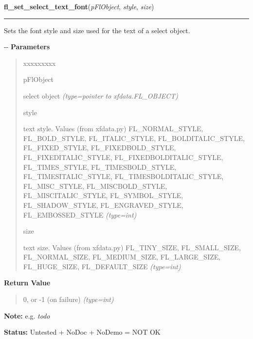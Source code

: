 \hspace{.8\funcindent}\begin{boxedminipage}{\funcwidth}

    \raggedright \textbf{fl\_set\_select\_text\_font}(\textit{pFlObject}, \textit{style}, \textit{size})

    \vspace{-1.5ex}

    \rule{\textwidth}{0.5\fboxrule}
\setlength{\parskip}{2ex}

Sets the font style and size used for the text of a select object.

-{}-
\setlength{\parskip}{1ex}
      \textbf{Parameters}
      \vspace{-1ex}

      \begin{quote}
        \begin{Ventry}{xxxxxxxxx}

          \item[pFlObject]


select object
            {\it (type=pointer to xfdata.FL\_OBJECT)}

          \item[style]


text style. Values (from xfdata.py) FL\_NORMAL\_STYLE,
FL\_BOLD\_STYLE, FL\_ITALIC\_STYLE, FL\_BOLDITALIC\_STYLE, FL\_FIXED\_STYLE,
FL\_FIXEDBOLD\_STYLE, FL\_FIXEDITALIC\_STYLE, FL\_FIXEDBOLDITALIC\_STYLE,
FL\_TIMES\_STYLE, FL\_TIMESBOLD\_STYLE, FL\_TIMESITALIC\_STYLE,
FL\_TIMESBOLDITALIC\_STYLE, FL\_MISC\_STYLE, FL\_MISCBOLD\_STYLE,
FL\_MISCITALIC\_STYLE, FL\_SYMBOL\_STYLE, FL\_SHADOW\_STYLE,
FL\_ENGRAVED\_STYLE, FL\_EMBOSSED\_STYLE
            {\it (type=int)}

          \item[size]


text size. Values (from xfdata.py) FL\_TINY\_SIZE, FL\_SMALL\_SIZE,
FL\_NORMAL\_SIZE, FL\_MEDIUM\_SIZE, FL\_LARGE\_SIZE, FL\_HUGE\_SIZE,
FL\_DEFAULT\_SIZE
            {\it (type=int)}

        \end{Ventry}

      \end{quote}

      \textbf{Return Value}
    \vspace{-1ex}

      \begin{quote}

0, or -1 (on failure)
      {\it (type=int)}

      \end{quote}

\textbf{Note:} 
e.g. \emph{todo}


\textbf{Status:} 
Untested + NoDoc + NoDemo = NOT OK


    \end{boxedminipage}

